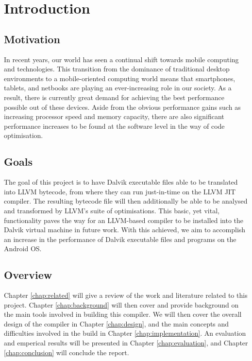 \chapter{Introduction}

\section{Motivation}

In recent years, our world has seen a continual shift towards mobile computing and technologies. This transition from the dominance of traditional desktop environments to a mobile-oriented computing world means that smartphones, tablets, and netbooks are playing an ever-increasing role in our society. As a result, there is currently great demand for achieving the best performance possible out of these devices. Aside from the obvious performance gains such as increasing processor speed and memory capacity, there are also significant performance increases to be found at the software level in the way of code optimisation.

\section{Goals}

The goal of this project is to have Dalvik executable files able to be translated into LLVM bytecode, from where they can run just-in-time on the LLVM JIT compiler. The resulting bytecode file will then additionally be able to be analysed and transformed by LLVM's suite of optimisations. This basic, yet vital, functionality paves the way for an LLVM-based compiler to be installed into the Dalvik virtual machine in future work. With this achieved, we aim to accomplish an increase in the performance of Dalvik executable files and programs on the Android OS.

\section{Overview}

Chapter \ref{chap:related} will give a review of the work and literature related to this project. Chapter \ref{chap:background} will then cover and provide background on the main tools involved in building this compiler. We will then cover the overall design of the compiler in Chapter \ref{chap:design}, and the main concepts and difficulties involved in the build in Chapter \ref{chap:implementation}. An evaluation and emperical results will be presented in Chapter \ref{chap:evaluation}, and Chapter \ref{chap:conclusion} will conclude the report.
